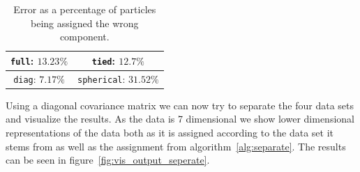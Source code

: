 \begin{table}[h!]
	\centering
	\begin{tabular}{|c|c|}
		\hline
		\texttt{full}: $13.23\%$ & \texttt{tied}: $12.7\%$ \\
		\hline
		\texttt{diag}: $7.17\%$ & \texttt{spherical}: $31.52\%$ \\
		\hline
	\end{tabular}
	\label{tab:covariance_type_comparison}
	\caption{Error as a percentage of particles being assigned the wrong component.}
\end{table}

Using a diagonal covariance matrix we can now try to separate the four data sets and visualize the results. As the data is 7 dimensional we show lower dimensional representations of the data both as it is assigned according to the data set it stems from as well as the assignment from algorithm~\ref{alg:separate}. The results can be seen in figure~\ref{fig:vis_output_seperate}.

